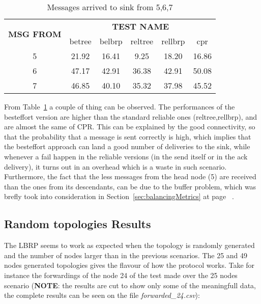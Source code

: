\documentclass{article}
\begin{document}
		\begin{table}[H]
			\begin{center}
			    \begin{tabular}{|c|c|c|c|c|c|}
				    \hline
				    \multirow{2}{*}{\textbf{MSG FROM}} & \multicolumn{5}{c|}{\textbf{TEST NAME}} \\ \cline{2-6}
					& betree & belbrp & reltree & rellbrp & cpr \\ \hline
					5 & 21.92 & 16.41 & 9.25 & 18.20 & 16.86 \\ \hline
					6 & 47.17 & 42.91 & 36.38 & 42.91 & 50.08 \\ \hline
					7 & 46.85 & 40.10 & 35.32 & 37.98 & 45.52 \\ \hline
			    \end{tabular}
			\end{center}	
			\caption{Messages arrived to sink from 5,6,7}
			\label{tab:stableArrivals}
		\end{table}
From Table~\ref{tab:stableArrivals} a couple of thing can be observed. The performances of the besteffort version are higher than the standard reliable ones (reltree,rellbrp), and are almost the same of CPR. This can be explained by the good connectivity, so that the probability that a message is sent correctly is high, which implies that the besteffort approach can land a good number of deliveries to the sink, while whenever a fail happen in the reliable versions (in the send itself or in the ack delivery), it turns out in an overhead which is a waste in such scenario. Furthermore, the fact that the less messages from the head node (5) are received than the ones from its descendants, can be due to the buffer problem, which was brefly took into consideration in Section~\ref{sec:balancingMetrics} at page ~\pageref{sec:balancingMetrics}.
	\subsection{Random topologies Results}
The LBRP seems to work as expected when the topology is randomly generated and the number of nodes larger than in the previous scenarios. The 25 and 49 nodes generated topologies gives the flavour of how the protocol works. Take for instance the forwardings of the node 24 of the test made over the 25 nodes scenario (\textbf{NOTE}: the results are cut to show only some of the meaningfull data, the complete results can be seen on the file \textit{forwarded\_24.csv}):
\end{document}
